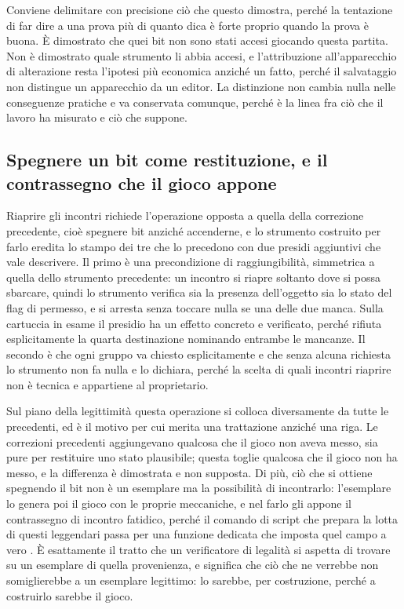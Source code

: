 Conviene delimitare con precisione ciò che questo dimostra, perché la tentazione di far dire a una prova più di quanto dica è forte proprio quando la prova è buona. È dimostrato che quei bit non sono stati accesi giocando questa partita. Non è dimostrato quale strumento li abbia accesi, e l'attribuzione all'apparecchio di alterazione resta l'ipotesi più economica anziché un fatto, perché il salvataggio non distingue un apparecchio da un editor. La distinzione non cambia nulla nelle conseguenze pratiche e va conservata comunque, perché è la linea fra ciò che il lavoro ha misurato e ciò che suppone.

\subsection{Spegnere un bit come restituzione, e il contrassegno che il gioco appone}

Riaprire gli incontri richiede l'operazione opposta a quella della correzione precedente, cioè spegnere bit anziché accenderne, e lo strumento costruito per farlo eredita lo stampo dei tre che lo precedono con due presidi aggiuntivi che vale descrivere. Il primo è una precondizione di raggiungibilità, simmetrica a quella dello strumento precedente: un incontro si riapre soltanto dove si possa sbarcare, quindi lo strumento verifica sia la presenza dell'oggetto sia lo stato del flag di permesso, e si arresta senza toccare nulla se una delle due manca. Sulla cartuccia in esame il presidio ha un effetto concreto e verificato, perché rifiuta esplicitamente la quarta destinazione nominando entrambe le mancanze. Il secondo è che ogni gruppo va chiesto esplicitamente e che senza alcuna richiesta lo strumento non fa nulla e lo dichiara, perché la scelta di quali incontri riaprire non è tecnica e appartiene al proprietario.

Sul piano della legittimità questa operazione si colloca diversamente da tutte le precedenti, ed è il motivo per cui merita una trattazione anziché una riga. Le correzioni precedenti aggiungevano qualcosa che il gioco non aveva messo, sia pure per restituire uno stato plausibile; questa toglie qualcosa che il gioco non ha messo, e la differenza è dimostrata e non supposta. Di più, ciò che si ottiene spegnendo il bit non è un esemplare ma la possibilità di incontrarlo: l'esemplare lo genera poi il gioco con le proprie meccaniche, e nel farlo gli appone il contrassegno di incontro fatidico, perché il comando di script che prepara la lotta di questi leggendari passa per una funzione dedicata che imposta quel campo a vero \cite{pokeemerald}. È esattamente il tratto che un verificatore di legalità si aspetta di trovare su un esemplare di quella provenienza, e significa che ciò che ne verrebbe non somiglierebbe a un esemplare legittimo: lo sarebbe, per costruzione, perché a costruirlo sarebbe il gioco.

